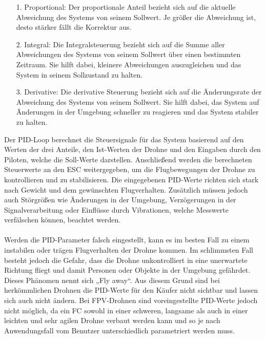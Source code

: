             \begin{itemize}
                \item[1.] Proportional: Der proportionale Anteil bezieht sich auf die aktuelle Abweichung des Systems von seinem Sollwert. Je größer die Abweichung ist, desto stärker fällt die Korrektur aus.
                \item[2.] Integral: Die Integralsteuerung bezieht sich auf die Summe aller Abweichungen des Systems von seinem Sollwert über einen bestimmten Zeitraum. Sie hilft dabei, kleinere Abweichungen auszugleichen und das System in seinem Sollzustand zu halten.
                \item[3.] Derivative: Die derivative Steuerung bezieht sich auf die Änderungsrate der Abweichung des Systems von seinem Sollwert. Sie hilft dabei, das System auf Änderungen in der Umgebung schneller zu reagieren und das System stabiler zu halten.
            \end{itemize}

            Der PID-Loop berechnet die Steuersignale für das System basierend auf den Werten der drei
            Anteile, den Ist-Werten der Drohne und den Eingaben durch den Piloten, welche die Soll-Werte
            darstellen. Anschließend werden die berechneten Steuerwerte an den ESC weitergegeben, um
            die Flugbewegungen der Drohne zu kontrollieren und zu stabilisieren. Die eingegebenen PID-Werte
            richten sich stark nach Gewicht und dem gewünschten Flugverhalten. Zusätzlich müssen jedoch
            auch Störgrößen wie Änderungen in der Umgebung, Verzögerungen in der Signalverarbeitung oder
            Einflüsse durch Vibrationen, welche Messwerte verfälschen können, beachtet werden. \\
            \\
            Werden die PID-Parameter falsch eingestellt, kann es im besten Fall zu einem instabilen oder
            trägen Flugverhalten der Drohne kommen. Im schlimmsten Fall besteht jedoch die Gefahr, dass
            die Drohne unkontrolliert in eine unerwartete Richtung fliegt und damit Personen oder Objekte
            in der Umgebung gefährdet. Dieses Phänomen nennt sich „Fly away“. Aus diesem Grund sind bei
            herkömmlichen Drohnen die PID-Werte für den Käufer nicht sichtbar und lassen sich auch nicht
            ändern. Bei FPV-Drohnen sind voreingestellte PID-Werte jedoch nicht möglich, da ein FC sowohl
            in einer schweren, langsame als auch in einer leichten und sehr agilen Drohne verbaut werden
            kann und so je nach Anwendungsfall vom Benutzer unterschiedlich parametriert werden muss.
        
